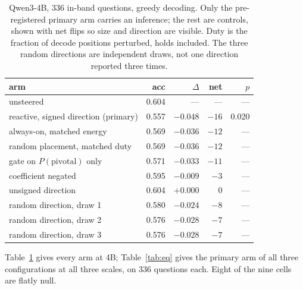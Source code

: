 \documentclass{article}
\begin{document}
\begin{table}[t]
\centering
\caption{Qwen3-4B, 336 in-band questions, greedy decoding. Only the
pre-registered primary arm carries an inference; the rest are controls,
shown with net flips so size and direction are visible. Duty is the
fraction of decode positions perturbed, holds included. The three random
directions are independent draws, not one direction reported three times.}
\label{tab:causal4b}
\small
\setlength{\tabcolsep}{4pt}
\begin{tabular}{lrrrr}
\toprule
arm & acc & $\Delta$ & net & $p$ \\
\midrule
unsteered & 0.604 & --- & --- & --- \\
reactive, signed direction (primary) & 0.557 & $-0.048$ & $-16$ & 0.020 \\
\midrule
always-on, matched energy & 0.569 & $-0.036$ & $-12$ & --- \\
random placement, matched duty & 0.569 & $-0.036$ & $-12$ & --- \\
gate on $P(\text{pivotal})$ only & 0.571 & $-0.033$ & $-11$ & --- \\
coefficient negated & 0.595 & $-0.009$ & $-3$ & --- \\
unsigned direction & 0.604 & $+0.000$ & $0$ & --- \\
\midrule
random direction, draw 1 & 0.580 & $-0.024$ & $-8$ & --- \\
random direction, draw 2 & 0.576 & $-0.028$ & $-7$ & --- \\
random direction, draw 3 & 0.576 & $-0.028$ & $-7$ & --- \\
\bottomrule
\end{tabular}
\end{table}

Table~\ref{tab:causal4b} gives every arm at 4B; Table~\ref{tab:eq} gives
the primary arm of all three configurations at all three scales, on 336
questions each. Eight of the nine cells are flatly null.

\begin{table}[t]
\centering
\caption{The primary arm of each configuration, at a common $n{=}336$.
``Probe'' is the logistic-regression weight vector, ``CAA'' a mean
difference; ablation removes the model's existing component along the
direction rather than adding to it. Sample sizes are equal by
construction, so the columns are comparable.}
\label{tab:eq}
\small
\setlength{\tabcolsep}{4pt}

\end{table}
\end{document}
